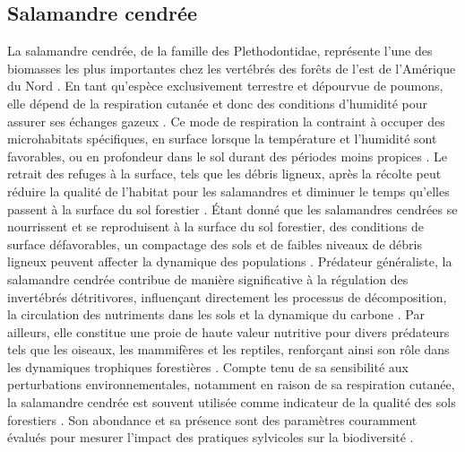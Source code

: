 \subsection*{Salamandre cendrée}

La salamandre cendrée, de la famille des Plethodontidae, représente l’une des biomasses les plus importantes chez les vertébrés des forêts de l’est de l’Amérique du Nord \citep{Burton1975Salamanderpopulations,Petranka1993Effectstimber,semlitschAbundanceBiomassProduction2014a}. 
En tant qu'espèce exclusivement terrestre et dépourvue de poumons, elle dépend de la respiration cutanée et donc des conditions d'humidité pour assurer ses échanges gazeux \citep{Heatwole1961Relationsubstrate}. 
Ce mode de respiration la contraint à occuper des microhabitats spécifiques, en surface lorsque la température et l'humidité sont favorables, ou en profondeur dans le sol durant des périodes moins propices \citep{Grizzell1949HibernationSite,FraserEmpiricalEvaluation1976,Jaeger1980MicrohabitatsTerrestrial}. 
Le retrait des refuges à la surface, tels que les débris ligneux, après la récolte peut réduire la qualité de l'habitat pour les salamandres et diminuer le temps qu'elles passent à la surface du sol forestier \citep{Achat2015Quantifyingconsequences,Peele2017Effectswoody}. 
Étant donné que les salamandres cendrées se nourrissent et se reproduisent à la surface du sol forestier, des conditions de surface défavorables, un compactage des sols et de faibles niveaux de débris ligneux peuvent affecter la dynamique des populations \citep{Peterman2014Spatialvariation}. 
Prédateur généraliste, la salamandre cendrée contribue de manière significative à la régulation des invertébrés détritivores, influençant directement les processus de décomposition, la circulation des nutriments dans les sols et la dynamique du carbone \citep{Burton1975Energyflow,Wyman1998Experimentalassessment,Walton2013Topdownregulation,Hickerson2017Easternredbacked}. 
Par ailleurs, elle constitue une proie de haute valeur nutritive pour divers prédateurs tels que les oiseaux, les mammifères et les reptiles, renforçant ainsi son rôle dans les dynamiques trophiques forestières \citep{Burton1975Energyflow,Pough1987abundancesalamanders}. 
Compte tenu de sa sensibilité aux perturbations environnementales, notamment en raison de sa respiration cutanée, la salamandre cendrée est souvent utilisée comme indicateur de la qualité des sols forestiers \citep{Welsh2001caseusing,Fisher-Reid2024Easternredbacked}. 
Son abondance et sa présence sont des paramètres couramment évalués pour mesurer l'impact des pratiques sylvicoles sur la biodiversité \citep{Harpole1999Effectsseven,Grialou2000effectsforest,Homyack2009Longtermeffects,Hocking2013Effectsexperimental,Mazerolle2021Woodlandsalamander}. 


